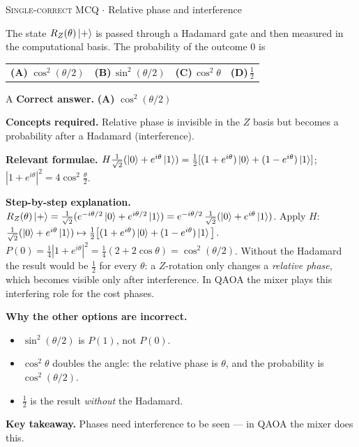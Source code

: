\documentclass[11pt,a4paper]{article}
\newcommand{\optlabel}[1]{\textbf{(#1)}}
\newcommand{\correctlabel}[1]{\textcolor{okgreen}{\textbf{(#1)}\,\ding{51}}}
\newenvironment{qitem}[1]{\begin{list}{}{\setlength{\leftmargin}{3.3em}\setlength{\labelwidth}{3.1em}%
  \setlength{\labelsep}{0.2em}\setlength{\topsep}{3pt}\setlength{\parsep}{3pt}}\item[\textbf{Q.#1}\hfill]}{\end{list}}
\newcommand{\qsep}{\par\vspace{2pt}{\color{black!15}\hrule}\vspace{4pt}}
\newcommand{\qmeta}[2]{{\footnotesize\color{black!60}\textsc{#1} \;$\cdot$\; #2}\par}
\begin{document}
\begin{qitem}{24}
\qmeta{Single-correct MCQ}{Relative phase and interference}
The state $R_Z(\theta)\ket{+}$ is passed through a Hadamard gate and then measured in the computational basis. The
probability of the outcome 0 is
\par\smallskip\noindent\begin{tabularx}{\linewidth}{@{}*{4}{L}@{}}
\correctlabel{A}\,$\cos^2(\theta/2)$ & \optlabel{B}\,$\sin^2(\theta/2)$ & \optlabel{C}\,$\cos^2\theta$ & \optlabel{D}\,$\tfrac12$
\end{tabularx}
\end{qitem}
\begin{solbox}{A}
\textbf{\color{brand}Correct answer.} \textcolor{okgreen}{\textbf{(A)}} $\cos^2(\theta/2)$

\textbf{\color{brand}Concepts required.} Relative phase is invisible in the $Z$ basis but becomes a probability after a Hadamard (interference).

\textbf{\color{brand}Relevant formulae.} $H\tfrac{1}{\sqrt2}(\ket0 + e^{i\theta}\ket1) = \tfrac12[(1 + e^{i\theta})\ket0 + (1 - e^{i\theta})\ket1]$; $|1 + e^{i\theta}|^2 = 4\cos^2\tfrac\theta2$.

\textbf{\color{brand}Step-by-step explanation.} $R_Z(\theta)\ket+ = \tfrac{1}{\sqrt2}(e^{-i\theta/2}\ket0 + e^{i\theta/2}\ket1) = e^{-i\theta/2}\,\tfrac{1}{\sqrt2}(\ket0 + e^{i\theta}\ket1)$.
Apply $H$: $\tfrac{1}{\sqrt2}(\ket0 + e^{i\theta}\ket1) \mapsto \tfrac12\big[(1 + e^{i\theta})\ket0 + (1 - e^{i\theta})\ket1\big]$.
$P(0) = \tfrac14|1 + e^{i\theta}|^2 = \tfrac14(2 + 2\cos\theta) = \cos^2(\theta/2)$.
Without the Hadamard the result would be $\tfrac12$ for every $\theta$: a $Z$-rotation only changes a \emph{relative phase},
which becomes visible only after interference. In QAOA the mixer plays this interfering role for the cost phases.

\textbf{\color{brand}Why the other options are incorrect.}
\begin{itemize}[leftmargin=2.4em, itemsep=1pt, topsep=2pt]
\item[\textbf{(B)}] $\sin^2(\theta/2)$ is $P(1)$, not $P(0)$.
\item[\textbf{(C)}] $\cos^2\theta$ doubles the angle: the relative phase is $\theta$, and the probability is $\cos^2(\theta/2)$.
\item[\textbf{(D)}] $\frac12$ is the result \emph{without} the Hadamard.
\end{itemize}
\textbf{\color{brand}Key takeaway.} Phases need interference to be seen --- in QAOA the mixer does this.
\end{solbox}
\qsep
\end{document}
